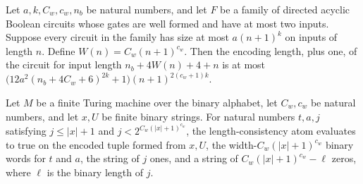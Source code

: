 \begin{theorem}
\label{Complexity.Meyer.desc_len_le}
\leanok
{}
Let $a,k,C_w,c_w,n_b$ be natural numbers, and let $F$ be a family of directed acyclic
Boolean circuits whose gates are well formed and have at most two inputs. Suppose every
circuit in the family has size at most $a(n+1)^k$ on inputs of length $n$. Define
$W(n)=C_w(n+1)^{c_w}$. Then the encoding length, plus one, of the circuit for input
length $n_b+4W(n)+4+n$ is at most
$\bigl(12a^2(n_b+4C_w+6)^{2k}+1\bigr)(n+1)^{2(c_w+1)k}$.
\end{theorem}

\begin{theorem}
\label{Complexity.Meyer.lenAll_inst}
\leanok
{}
Let $M$ be a finite Turing machine over the binary alphabet, let $C_w,c_w$ be natural
numbers, and let $x,U$ be finite binary strings. For natural numbers $t,a,j$ satisfying
$j\le |x|+1$ and $j<2^{C_w(|x|+1)^{c_w}}$, the length-consistency atom evaluates to true
on the encoded tuple formed from $x,U$, the width-$C_w(|x|+1)^{c_w}$ binary words for
$t$ and $a$, the string of $j$ ones, and a string of $C_w(|x|+1)^{c_w}-\ell$ zeros,
where $\ell$ is the binary length of $j$.
\end{theorem}

